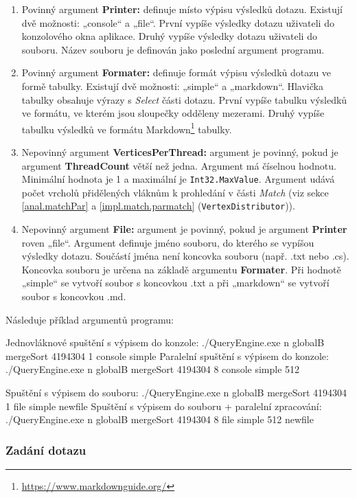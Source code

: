 \begin{enumerate}
\item Povinný argument \textbf{Printer:} definuje místo výpisu výsledků dotazu.
Existují dvě možnosti: „console“ a „file“.
První vypíše výsledky dotazu uživateli do konzolového okna aplikace.
Druhý vypíše výsledky dotazu uživateli do souboru.
Název souboru je definován jako poslední argument programu.

\item Povinný argument \textbf{Formater:} definuje formát výpisu výsledků dotazu ve formě tabulky.
Existují dvě možnosti: „simple“ a „markdown“.
Hlavička tabulky obsahuje výrazy s \textit{Select} části dotazu.
První vypíše tabulku výsledků ve formátu, ve kterém jsou sloupečky odděleny mezerami.
Druhý vypíše tabulku výsledků ve formátu Markdown\footnote{\url{https://www.markdownguide.org/}} tabulky.

\item Nepovinný argument \textbf{VerticesPerThread:} argument je povinný, pokud je argument \textbf{ThreadCount} větší než jedna.
Argument má číselnou hodnotu.
Minimální hodnota je 1 a maximální je \texttt{Int32.MaxValue}.
Argument udává počet vrcholů přidělených vláknům k prohledání v části \textit{Match} (viz sekce \ref{anal.matchPar} a \ref{impl.match.parmatch} (\texttt{VertexDistributor})).

\item Nepovinný argument \textbf{File:} argument je povinný, pokud je argument \textbf{Printer} roven „file“.
Argument definuje jméno souboru, do kterého se vypíšou výsledky dotazu.
Součástí jména není koncovka souboru (např. .txt nebo .cs).
Koncovka souboru je určena na základě argumentu \textbf{Formater}.
Při hodnotě „simple“ se vytvoří soubor s koncovkou .txt a při „markdown“ se vytvoří soubor s koncovkou .md. 
\end{enumerate}

Následuje příklad argumentů programu:
\begin{code}
Jednovláknové spuštění s výpisem do konzole:
./QueryEngine.exe n globalB mergeSort 4194304 1 console simple
Paralelní spuštění s výpisem do konzole:
./QueryEngine.exe n globalB mergeSort 4194304 8 console simple 512

Spuštění s výpisem do souboru:  
./QueryEngine.exe n globalB mergeSort 4194304 1 file simple newfile
Spuštění s výpisem do souboru + paralelní zpracování:
./QueryEngine.exe n globalB mergeSort 4194304 8 file simple 512 newfile
\end{code}

\subsubsection{Zadání dotazu}

